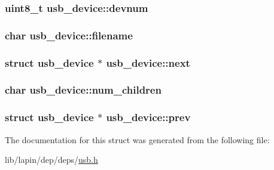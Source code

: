 \hypertarget{structusb__device_ada834f5ec253d168e4044a08c5c1944d}{
\subsubsection[{devnum}]{\setlength{\rightskip}{0pt plus 5cm}uint8\-\_\-t usb\-\_\-device\-::devnum}}\label{structusb__device_ada834f5ec253d168e4044a08c5c1944d}
\hypertarget{structusb__device_a11384a2a94b0e712ae21d975265fbce3}{
\subsubsection[{filename}]{\setlength{\rightskip}{0pt plus 5cm}char usb\-\_\-device\-::filename}}\label{structusb__device_a11384a2a94b0e712ae21d975265fbce3}
\hypertarget{structusb__device_a83611947394f9efcce4968c87c43a5ab}{
\subsubsection[{next}]{\setlength{\rightskip}{0pt plus 5cm}struct {\bf usb\-\_\-device} $\ast$ usb\-\_\-device\-::next}}\label{structusb__device_a83611947394f9efcce4968c87c43a5ab}
\hypertarget{structusb__device_a88363220bd62e20d3fd5672a8be44a44}{
\subsubsection[{num\-\_\-children}]{ char usb\-\_\-device\-::num\-\_\-children}}\label{structusb__device_a88363220bd62e20d3fd5672a8be44a44}
\hypertarget{structusb__device_a0f17263bca031533ee31834e4ad8f71a}{
\subsubsection[{prev}]{\setlength{\rightskip}{0pt plus 5cm}struct {\bf usb\-\_\-device} $\ast$ usb\-\_\-device\-::prev}}\label{structusb__device_a0f17263bca031533ee31834e4ad8f71a}


The documentation for this struct was generated from the following file\-:\begin{DoxyCompactItemize}
\item 
lib/lapin/dep/deps/\hyperlink{deps_2usb_8h}{usb.\-h}\end{DoxyCompactItemize}
